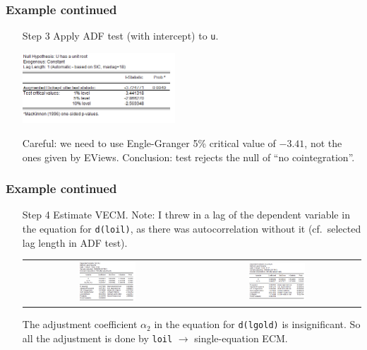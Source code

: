 \begin{frame}\frametitle{Example continued}
\begin{itemize}
\item[Step 3] Apply ADF test (with intercept) to \texttt{u}.
\begin{center}
\includegraphics[width=0.45\textwidth]{englegrangertest}
\end{center}
Careful: we need to use Engle-Granger 5\% critical value of $-3.41$, not the ones given by EViews. Conclusion: test rejects the null of ``no cointegration''.
\end{itemize}
\end{frame}
\begin{frame}\frametitle{Example continued}
\begin{itemize}
\item[Step 4] Estimate VECM. Note: I threw in a lag of the dependent variable in the equation for \texttt{d(loil)}, as there was autocorrelation without it (cf.\ selected lag length in ADF test).
\begin{center}
\begin{center}
\begin{tabular}{cc}
\includegraphics[width=0.35\textwidth]{vecm1} & \includegraphics[width=0.35\textwidth]{vecm2}
\end{tabular}
\end{center}
\end{center}
The adjustment coefficient $\alpha_2$ in the equation for \texttt{d(lgold)} is insignificant. So all the adjustment is done by \texttt{loil} $\rightarrow$ single-equation ECM.
\end{itemize}
\end{frame}

